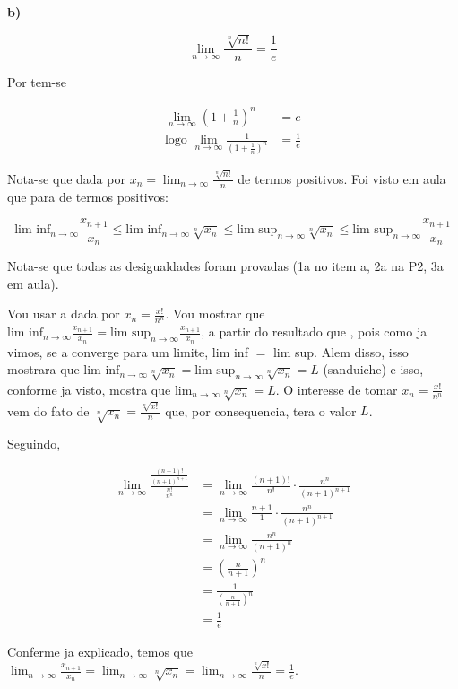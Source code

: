 \textbf{b)}

$$
\lim_{n\rightarrow\infty} \frac{\sqrt[n]{n!}}{n} = \frac{1}{e}
$$

Por  tem-se 

\begin{align*}
	\lim_{n\rightarrow\infty} (1 + \frac{1}{n})^n &= e \\
	\text{logo } \lim_{n\rightarrow\infty} \frac{1}{(1 + \frac{1}{n})^n} &= \frac{1}{e}
\end{align*}

Nota-se que  dada por $x_n = \lim_{n\rightarrow\infty} \frac{\sqrt[n]{n!}}{n}$ \eh de termos positivos. Foi visto em aula que para \sequencia de termos positivos:

$$
\text{lim inf}_{n\rightarrow\infty} \frac{x_{n+1}}{x_n} \le \text{lim inf}_{n\rightarrow\infty} \sqrt[n]{x_n} \le \text{lim sup}_{n\rightarrow\infty} \sqrt[n]{x_n} \le \text{lim sup}_{n\rightarrow\infty} \frac{x_{n+1}}{x_n}
$$

Nota-se que todas as desigualdades foram provadas (1a no item a, 2a na P2, 3a em aula).

Vou usar a \sequencia {} dada por $x_n = \frac{x!}{n^n}$. Vou mostrar que $\text{lim inf}_{n\rightarrow\infty} \frac{x_{n+1}}{x_n} = \text{lim sup}_{n\rightarrow\infty} \frac{x_{n+1}}{x_n}$, a partir do resultado que , pois como ja vimos, se a \sequencia converge para um limite, \entao lim inf $=$ lim sup. Alem disso, isso mostrara que $\text{lim inf}_{n\rightarrow\infty} \sqrt[n]{x_n} = \text{lim sup}_{n\rightarrow\infty} \sqrt[n]{x_n} = L$ (sanduiche) e isso, conforme ja visto, mostra que lim$_{n\rightarrow\infty} \sqrt[n]{x_n} = L$. O interesse de tomar $x_n = \frac{x!}{n^n}$ vem do fato de $\sqrt[n]{x_n} = \frac{\sqrt[n]{x!}}{n}$ que, por consequencia, tera o valor $L$.

Seguindo,

\begin{align*}
	\lim_{n\rightarrow\infty} \frac{\frac{(n+1)!}{(n+1)^{n+1}}}{\frac{n!}{n^n}} &= \lim_{n\rightarrow\infty} \frac{(n+1)!}{n!}\cdot\frac{n^n}{(n+1)^{n+1}} \\
	&= \lim_{n\rightarrow\infty} \frac{n+1}{1}\cdot\frac{n^n}{(n+1)^{n+1}}\\
	&= \lim_{n\rightarrow\infty} \frac{n^n}{(n+1)^n}\\
	&= (\frac{n}{n+1})^n \\
	&= \frac{1}{(\frac{n}{n+1})^n}\\
	&= \frac{1}{e}
\end{align*}

Conferme ja explicado, temos que \mbox{$\lim_{n\rightarrow\infty}\frac{x_{n+1}}{x_n} = \lim_{n\rightarrow\infty}\sqrt[n]{x_n} =  \lim_{n\rightarrow\infty}\frac{\sqrt[n]{x!}}{n} = \frac{1}{e}$}.









